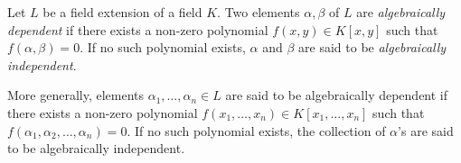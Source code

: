 \documentclass[12pt]{article}
\newcommand{\<}{\langle}
\renewcommand{\>}{\rangle}
\begin{document}
Let $L$ be a field extension of a field $K$.  Two elements $\alpha, \beta$ of $L$ are \emph{algebraically dependent} if there exists a non-zero polynomial $f(x,y)\in K[x,y]$ such that $f(\alpha,\beta)=0$.  If no such polynomial exists, $\alpha$ and $\beta$ are said to be \emph{algebraically independent}.

More generally, elements $\alpha_1,\ldots,\alpha_n\in L$ are said to be algebraically dependent if there exists a non-zero polynomial $f(x_1,\ldots,x_n)\in K[x_1,\ldots,x_n]$ such that $f(\alpha_1,\alpha_2,\ldots,\alpha_n)=0$.  If no such polynomial exists, the collection of $\alpha$'s are said to be algebraically independent.
\end{document}
